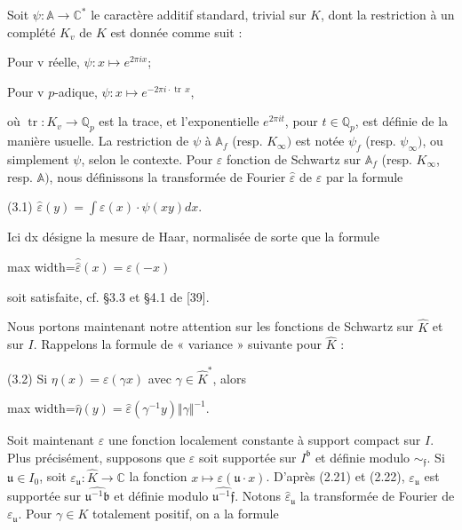 \documentclass[11pt]{article}
\newcommand{\DFormula}[1]{\par\smallskip\noindent\begin{adjustbox}{max width=\linewidth}$\displaystyle #1$\end{adjustbox}\par\smallskip}
\begin{document}
\par
Soit \(\psi :𝔸\to \mathbb{C}^{\ast}\) le caractère additif standard, trivial sur \(K\), dont la restriction à un complété \(K_{v}\) de \(K\) est donnée comme suit :\par
\par
Pour v réelle, \(\psi :x\mapsto e^{2\pi ix}\);\par
\par
Pour v \(p\)-adique, \(\psi :x\mapsto e^{-2\pi i\cdot \operatorname{tr}\,x}\),\par
\par
où \(\operatorname{tr}:K_{v}\to \mathbb{Q}_{p}\) est la trace, et l’exponentielle \(e^{2\pi it}\), pour \(t\in \mathbb{Q}_{p}\), est définie de la manière usuelle. La restriction de \(\psi \) à \(𝔸_{f}\) (resp. \(K_{\infty })\) est notée \(\psi _{f}\) (resp. \(\psi _{\infty })\), ou simplement \(\psi \), selon le contexte. Pour \(\varepsilon \) fonction de Schwartz sur \(𝔸_{f}\) (resp. \(K_{\infty }\), resp. \(𝔸)\), nous définissons la transformée de Fourier \(\widehat{\varepsilon }\) de \(\varepsilon \) par la formule\par
\par
(3.1)    \(\widehat{\varepsilon }(y)=\int \varepsilon (x)\cdot \psi (xy)dx\).\par
\par
Ici dx désigne la mesure de Haar, normalisée de sorte que la formule\par
\par
\DFormula{\widehat{\widehat{\varepsilon }}(x)=\varepsilon (-x)}
\par
soit satisfaite, cf. §3.3 et §4.1 de [39].\par
\par
Nous portons maintenant notre attention sur les fonctions de Schwartz sur \(\widehat{K}\) et sur \(I\). Rappelons la formule de « variance » suivante pour \(\widehat{K}\) :\par
\par
(3.2) Si \(\eta (x)=\varepsilon (\gamma x)\) avec \(\gamma \in \widehat{K}^{\ast}\), alors\par
\par
\DFormula{\widehat{\eta }(y)=\widehat{\varepsilon }(\gamma ^{-1}y)\Vert \gamma \Vert ^{-1}.}
\par
Soit maintenant \(\varepsilon \) une fonction localement constante à support compact sur \(I\). Plus précisément, supposons que \(\varepsilon \) soit supportée sur \(I^{𝔟}\) et définie modulo \(\sim _{𝔣}\). Si \(𝔲\in I_{0}\), soit \(\varepsilon _{𝔲}:\widehat{K}\to \mathbb{C}\) la fonction \(x\mapsto \varepsilon (𝔲\cdot x)\). D’après (2.21) et (2.22), \(\varepsilon _{𝔲}\) est supportée sur \(\widehat{𝔲^{-1}𝔟}\) et définie modulo \(\widehat{𝔲^{-1}𝔣}\). Notons \(\widehat{\varepsilon }_{𝔲}\) la transformée de Fourier de \(\varepsilon _{𝔲}\). Pour \(\gamma \in K\) totalement positif, on a la formule\par
\end{document}
